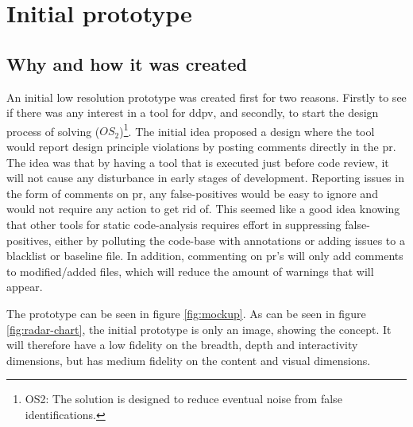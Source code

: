 \documentclass[pdftex,10pt,b5paper,twoside]{report}
\begin{document}
\section{Initial prototype}
\label{initial-prototype}
\subsection*{Why and how it was created}
An initial low resolution prototype was created first for two reasons. Firstly to see if there was any interest in a tool for \gls{ddpv}, and secondly, to start the design process of solving 
(\(OS_{2}\))\footnote{OS2: The solution is designed to reduce eventual noise from false identifications.}. The initial idea proposed a design where the tool would report design principle violations by posting comments directly in the \gls{pr}. The idea was that by having a tool that is executed just before code review, it will not cause any disturbance in early stages of development. Reporting issues in the form of comments on \gls{pr}, any false-positives would be easy to ignore and would not require any action to get rid of. This seemed like a good idea knowing that other tools for static code-analysis requires effort in suppressing false-positives, either by polluting the code-base with annotations or adding issues to a blacklist or baseline file. In addition, commenting on \gls{pr}'s will only add comments to modified/added files, which will reduce the amount of warnings that will appear.  

The prototype can be seen in figure \ref{fig:mockup}. As can be seen in figure \ref{fig:radar-chart}, the initial prototype is only an image, showing the concept. It will therefore have a low fidelity on the breadth, depth and interactivity dimensions, but has medium fidelity on the content and visual dimensions. 
\end{document}
